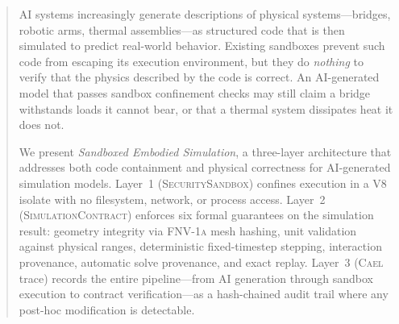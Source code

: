\documentclass[letterpaper,twocolumn,10pt]{article}
\newcommand{\cael}{\textsc{Cael}}
\newcommand{\simcontract}{\textsc{SimulationContract}}
\newcommand{\fnvhash}{\textsc{FNV-1a}}
\newcommand{\sandbox}{\textsc{SecuritySandbox}} %
\begin{document}
\begin{abstract}
AI systems increasingly generate descriptions of physical systems---bridges,
robotic arms, thermal assemblies---as structured code that is then simulated
to predict real-world behavior. Existing sandboxes prevent such code from
escaping its execution environment, but they do \emph{nothing} to verify
that the physics described by the code is correct. An AI-generated model that
passes sandbox confinement checks may still claim a bridge withstands loads
it cannot bear, or that a thermal system dissipates heat it does not.

We present \emph{Sandboxed Embodied Simulation}, a three-layer architecture
that addresses both code containment and physical correctness for AI-generated
simulation models. Layer~1 (\sandbox{}) confines execution in a V8 isolate with
no filesystem, network, or process access. Layer~2 (\simcontract{}) enforces
six formal guarantees on the simulation result: geometry integrity via
\fnvhash{} mesh hashing, unit validation against physical ranges, deterministic
fixed-timestep stepping, interaction provenance, automatic solve provenance,
and exact replay. Layer~3 (\cael{} trace) records the entire pipeline---from
AI generation through sandbox execution to contract verification---as a
hash-chained audit trail where any post-hoc modification is detectable.


\end{abstract}
\end{document}
